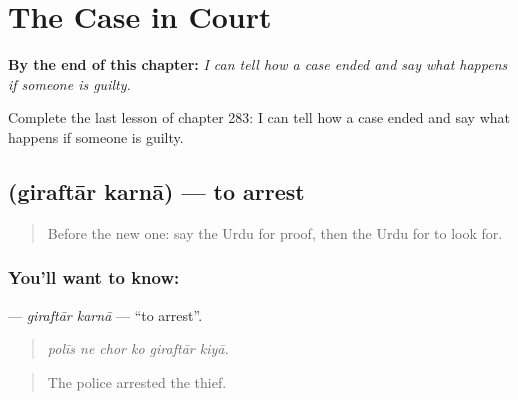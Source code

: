 
\chapter{The Case in Court}
\label{ch:ur-the-case-in-court}

\begin{chapteropening}
\textbf{By the end of this chapter:} \emph{I can tell how a case ended and say what happens if someone is guilty.}

Complete the last lesson of chapter 283: I can tell how a case ended and say what happens if someone is guilty.
\end{chapteropening}

\section[\texorpdfstring{\ur{گرفتار} \ur{کرنا} (giraftār karnā)}{گرفتار کرنا (giraftār karnā)}]{  (giraftār karnā) — to arrest}

\label{lesson:UR-C283-giraftar-karna}



\begin{quote}
Before the new one: say the Urdu for proof, then the Urdu for to look for.
\end{quote}

\subsection*{You'll want to know:  }
\textbf{ } — \emph{giraftār karnā} — \textquotedblleft{}to arrest\textquotedblright{}.

\begin{quote}
     
\end{quote}

\begin{quote}
\emph{polīs ne chor ko giraftār kiyā.}
\end{quote}

\begin{quote}
The police arrested the thief.
\end{quote}

